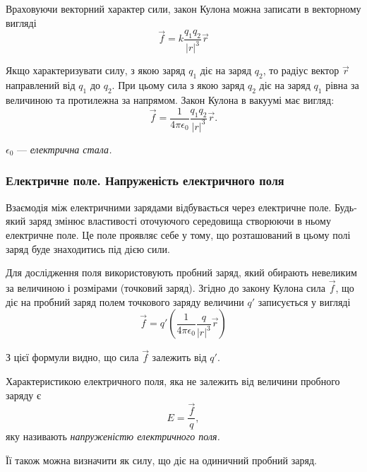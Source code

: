 Враховуючи векторний характер сили, закон Кулона можна записати в векторному вигляді
\begin{equation}
	\vec f = k \frac{q_1 q_2}{|r|^3} \vec r
\end{equation}

Якщо характеризувати силу, з якою заряд $q_1$ діє на заряд $q_2$, то радіус вектор $\vec r$ направлений від $q_1$ до $q_2$. При цьому сила з якою заряд $q_2$ діє на заряд $q_1$ рівна за величиною та протилежна за напрямом. Закон Кулона в вакуумі має вигляд:
\begin{equation}
	\vec f = \frac{1}{4 \pi \epsilon_0} \frac{q_1q_2}{|r|^3} \vec r.
\end{equation}

\begin{definition}
	$\epsilon_0$ --- \it{електрична стала}.
\end{definition}

\subsubsection{Електричне поле. Напруженість електричного поля}

Взаємодія між електричними зарядами відбувається через електричне поле. Будь-який заряд змінює властивості оточуючого середовища створюючи в ньому електричне поле. Це поле проявляє себе у тому, що розташований в цьому полі заряд буде знаходитись під дією сили. \medskip

Для дослідження поля використовують пробний заряд, який обирають невеликим за величиною і розмірами (точковий заряд). Згідно до закону Кулона сила $\vec f$, що діє на пробний заряд   полем точкового заряду величини $q'$ записується у вигляді
\begin{equation}
	\vec f = q' \left( \frac{1}{4 \pi \epsilon_0} \frac{q}{|r|^3} \vec r \right)
\end{equation}

З цієї формули видно, що сила $\vec f$ залежить від $q'$.

\begin{definition}
	Характеристикою електричного поля, яка не залежить від величини пробного заряду є
	\begin{equation}
		E = \frac{\vec f}{q},
	\end{equation}
	яку називають \it{напруженістю електричного поля}.
\end{definition}

\begin{remark}
	Її також можна визначити як силу, що діє на одиничний пробний заряд.
\end{remark}

